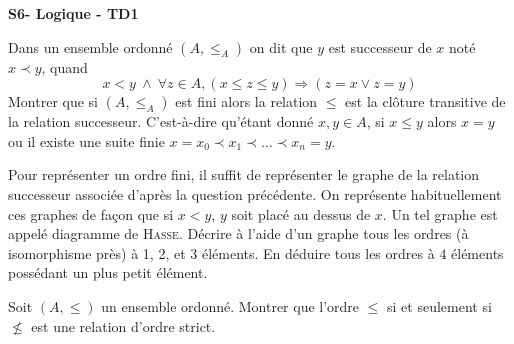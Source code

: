 \documentclass[french]{report}
\begin{document}
\begin{center}
    \huge{\textbf{S6- Logique - TD1}}
\end{center}

\begin{exo}
    Dans un ensemble ordonné \(\left(A, \leq_A\right)\) on dit que \(y\) est successeur
    de \(x\) noté \(x\prec y\), quand
    \[x<y\ \land\ \forall z\in A, (x\leq z\leq y)\Rightarrow(z=x\lor z=y)\]
    Montrer que si \(\left(A, \leq_A\right)\) est fini alors la relation \(\leq\) est la
    clôture transitive de la relation successeur. C'est-à-dire qu'étant donné \(x,y\in A\),
    si \(x\leq y\) alors \(x=y\) ou il existe une suite finie \(x=x_0\prec x_1\prec\dots
    \prec x_n=y\).
\end{exo}

\begin{exo}
    Pour représenter un ordre fini, il suffit de représenter le graphe de la relation
    successeur associée d'après la question précédente. On représente habituellement
    ces graphes de façon que si \(x<y\), \(y\) soit placé au dessus de \(x\). Un tel
    graphe est appelé diagramme de \textsc{Hasse}. Décrire à l'aide d'un graphe tous les
    ordres (à isomorphisme près) à 1, 2, et 3 éléments. En déduire tous les ordres à
    \(4\) éléments possédant un plus petit élément.
\end{exo}

\begin{exo}
    Soit \(\left(A, \leq\right)\) un ensemble ordonné. Montrer que l'ordre \(\leq\)
    si et seulement si \(\not\leq\) est une relation d'ordre strict.
\end{exo}
\end{document}
